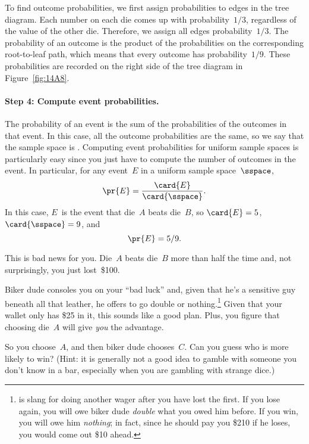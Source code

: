 To find outcome probabilities, we first assign probabilities to edges
in the tree diagram.  Each number on each die comes up with
probability~$1/3$, regardless of the value of the other die.
Therefore, we assign all edges probability~$1/3$.  The probability of
an outcome is the product of the probabilities on the corresponding
root-to-leaf path, which means that every outcome has
probability~$1/9$.  These probabilities are recorded on the right side
of the tree diagram in Figure~\ref{fig:14A8}.

\paragraph{Step 4: Compute event probabilities.}

The probability of an event is the sum of the probabilities of the
outcomes in that event.  In this case, all the outcome probabilities
are the same, so we say that the sample space is \emph{}.
Computing event probabilities for uniform sample spaces is
particularly easy since you just have to compute the number of
outcomes in the event.  In particular, for any event~$E$ in a uniform
sample space~$\sspace$,
\begin{equation}\label{eqn:14F1}
    \pr{E} = \frac{\card{E}}{\card{\sspace}}.
\end{equation}
In this case, $E$~is the event that die~$A$ beats die~$B$, so
$\card{E} = 5$, \ $\card{\sspace} = 9$, and
\begin{equation*}
    \pr{E} = 5/9.
\end{equation*}

This is bad news for you.  Die~$A$ beats die~$B$ more than half the
time and, not surprisingly, you just lost~\$100.

Biker dude consoles you on your ``bad luck'' and, given that he's a
sensitive guy beneath all that leather, he offers to go double or
nothing.\footnote{ is slang for doing another
  wager after you have lost the first.  If you lose again, you will
  owe biker dude \emph{double} what you owed him before.  If you win,
  you will owe him \emph{nothing}; in fact, since he should pay you
  \$210 if he loses, you would come out \$10 ahead.}  Given that your
wallet only has \$25 in it, this sounds like a good plan.  Plus, you
figure that choosing die~$A$ will give \emph{you} the advantage.

So you choose~$A$, and then biker dude chooses~$C$.  Can you guess who
is more likely to win?  (Hint: it is generally not a good idea to
gamble with someone you don't know in a bar, especially when you are
gambling with strange dice.)

